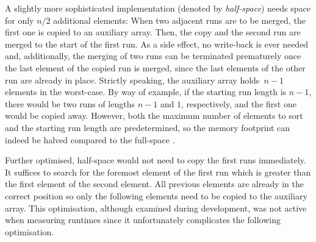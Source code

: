 A slightly more sophisticated implementation (denoted by \emph{half-space}) needs space for only \(n/2\) additional elements:
When two adjacent runs are to be merged, the first one is copied to an auxiliary array.
Then, the copy and the second run are merged to the start of the first run.
As a side effect, no write-back is ever needed and, additionally, the merging of two runs can be terminated prematurely once the last element of the copied run is merged, since the last elements of the other run are already in place.
Strictly speaking, the auxiliary array holds~\(n-1\) elements in the worst-case.
By way of example, if the starting run length is \(n - 1\), there would be two runs of lengths \(n - 1\) and \(1\), respectively, and the first one would be copied away.
However, both the maximum number of elements to sort and the starting run length are predetermined, so the memory footprint can indeed be halved compared to the full-space \MS{}.

Further optimised, half-space \MS{} would not need to copy the first runs immediately.
It suffices to search for the foremost element of the first run which is greater than the first element of the second element.
All previous elements are already in the correct position so only the following elements need to be copied to the auxiliary array.
This optimisation, although examined during development, was not active when measuring runtimes since it unfortunately complicates the following optimisation.

